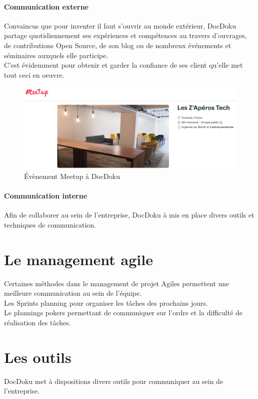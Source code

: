 \documentclass[11pt]{report}
\begin{document}
		\paragraph{Communication externe\\}
			Convaincus que pour inventer il faut s'ouvrir au monde extérieur, DocDoku partage quotidiennement ses expériences et compétences au travers d'ouvrages, de contributions Open Source, de son blog ou de nombreux événements et séminaires auxquels elle participe.\\
			C'est évidemment pour obtenir et garder la confiance de ses client qu'elle met tout ceci en oeuvre.

		\begin{figure}[!htb]
			\includegraphics[scale = 0.4,left]{meetup.png}
			\caption{Évènement Meetup à DocDoku}
		\end{figure}

		\paragraph{Communication interne\\}
			Afin de collaborer au sein de l'entreprise, DocDoku à mis en place divers outils et techniques de communication.

		\section{Le management agile}
			Certaines méthodes dans le management de projet Agiles permettent une meilleure communication au sein de l'équipe. \\
			Les Sprints planning pour organiser les tâches des prochains jours.\\
			Le plannings pokers permettant de communiquer sur l'ordre et la difficulté de réalisation des tâches.

		\newpage
		\section{Les outils}
			DocDoku met à dispositions divers outils pour communiquer au sein de l'entreprise.
\end{document}
